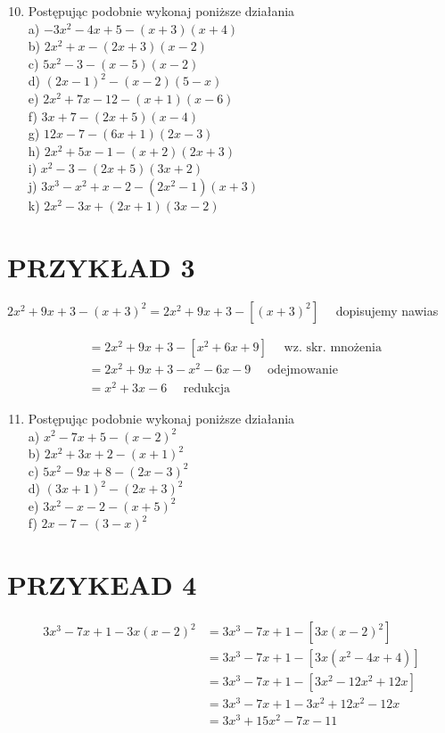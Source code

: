 \documentclass[10pt]{article}
\begin{document}
\begin{enumerate}
  \setcounter{enumi}{9}
  \item Postępując podobnie wykonaj poniższe działania\\
a) \(-3 x^{2}-4 x+5-(x+3)(x+4)\)\\
b) \(2 x^{2}+x-(2 x+3)(x-2)\)\\
c) \(5 x^{2}-3-(x-5)(x-2)\)\\
d) \((2 x-1)^{2}-(x-2)(5-x)\)\\
e) \(2 x^{2}+7 x-12-(x+1)(x-6)\)\\
f) \(3 x+7-(2 x+5)(x-4)\)\\
g) \(12 x-7-(6 x+1)(2 x-3)\)\\
h) \(2 x^{2}+5 x-1-(x+2)(2 x+3)\)\\
i) \(x^{2}-3-(2 x+5)(3 x+2)\)\\
j) \(3 x^{3}-x^{2}+x-2-\left(2 x^{2}-1\right)(x+3)\)\\
k) \(2 x^{2}-3 x+(2 x+1)(3 x-2)\)
\end{enumerate}

\section*{PRZYKŁAD 3}
\(2 x^{2}+9 x+3-(x+3)^{2}=2 x^{2}+9 x+3-\left[(x+3)^{2}\right] \quad\) dopisujemy nawias

\[
\begin{aligned}
& =2 x^{2}+9 x+3-\left[x^{2}+6 x+9\right] \quad \text { wz. skr. mnożenia } \\
& =2 x^{2}+9 x+3-x^{2}-6 x-9 \quad \text { odejmowanie } \\
& =x^{2}+3 x-6 \quad \text { redukcja }
\end{aligned}
\]

\begin{enumerate}
  \setcounter{enumi}{10}
  \item Postępując podobnie wykonaj poniższe działania\\
a) \(x^{2}-7 x+5-(x-2)^{2}\)\\
b) \(2 x^{2}+3 x+2-(x+1)^{2}\)\\
c) \(5 x^{2}-9 x+8-(2 x-3)^{2}\)\\
d) \((3 x+1)^{2}-(2 x+3)^{2}\)\\
e) \(3 x^{2}-x-2-(x+5)^{2}\)\\
f) \(2 x-7-(3-x)^{2}\)
\end{enumerate}

\section*{PRZYKEAD 4}
\[
\begin{aligned}
3 x^{3}-7 x+1-3 x(x-2)^{2} & =3 x^{3}-7 x+1-\left[3 x(x-2)^{2}\right] \\
& =3 x^{3}-7 x+1-\left[3 x\left(x^{2}-4 x+4\right)\right] \\
& =3 x^{3}-7 x+1-\left[3 x^{2}-12 x^{2}+12 x\right] \\
& =3 x^{3}-7 x+1-3 x^{2}+12 x^{2}-12 x \\
& =3 x^{3}+15 x^{2}-7 x-11
\end{aligned}
\]
\end{document}
